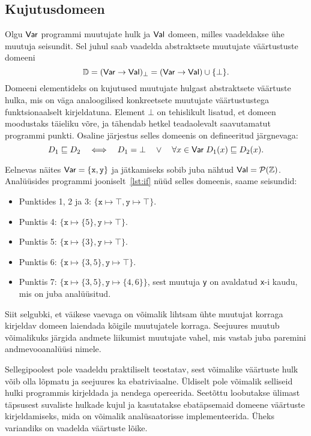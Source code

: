\documentclass[../thesis.tex]{subfiles}
\begin{document}
\subsection{Kujutusdomeen}
Olgu $\mathsf{Var}$ programmi muutujate hulk ja $\mathsf{Val}$ domeen, milles vaadeldakse ühe muutuja seisundit. Sel juhul saab vaadelda abstraktsete muutujate väärtustuste domeeni~\cite[45]{seidl_foundations}
\[
	\mathbb{D} = (\mathsf{Var} \to \mathsf{Val})_\bot = (\mathsf{Var} \to \mathsf{Val}) \cup \{\bot\}.
\]
Domeeni elementideks on kujutused muutujate hulgast abstraktsete väärtuste hulka, mis on väga analoogilised konkreetsete muutujate väärtustustega funktsionaalselt kirjeldatuna. Element $\bot$ on tehislikult lisatud, et domeen moodustaks täieliku võre, ja tähendab hetkel teadaolevalt saavutamatut programmi punkti. Osaline järjestus selles domeenis on defineeritud järgnevaga:
\[
	D_1 \sqsubseteq D_2 \quad\Longleftrightarrow\quad D_1 = \bot \quad\lor\quad \forall x \in \mathsf{Var}\; D_1(x) \sqsubseteq D_2(x).
\]

Eelnevas näites $\mathsf{Var} = \{\texttt{x}, \texttt{y}\}$ ja jätkamiseks sobib juba nähtud $\mathsf{Val} = \mathcal{P}(\mathbb{Z})$. Analüüsides programmi jooniselt~\ref{lst:if} nüüd selles domeenis, saame seisundid:
\begin{itemize}
	\item Punktides 1, 2 ja 3: $\{ \texttt{x} \mapsto \top, \texttt{y} \mapsto \top \}$.
	\item Punktis 4: $\{ \texttt{x} \mapsto \{5\}, \texttt{y} \mapsto \top \}$.
	\item Punktis 5: $\{ \texttt{x} \mapsto \{3\}, \texttt{y} \mapsto \top \}$.
	\item Punktis 6: $\{ \texttt{x} \mapsto \{3, 5\}, \texttt{y} \mapsto \top \}$.
	\item Punktis 7: $\{ \texttt{x} \mapsto \{3, 5\}, \texttt{y} \mapsto \{4, 6\} \}$, sest muutuja \texttt{y} on avaldatud \texttt{x}-i kaudu, mis on juba analüüsitud.
\end{itemize}

Siit selgubki, et väikese vaevaga on võimalik lihtsam ühte muutujat korraga kirjeldav domeen laiendada kõigile muutujatele korraga. Seejuures muutub võimalikuks järgida andmete liikumist muutujate vahel, mis vastab juba paremini andmevooanalüüsi nimele.

Sellegipoolest pole vaadeldu praktiliselt teostatav, sest võimalike väärtuste hulk võib olla lõpmatu ja seejuures ka ebatriviaalne. Üldiselt pole võimalik selliseid hulki programmis kirjeldada ja nendega opereerida. Seetõttu loobutakse ülimast täpsusest suvaliste hulkade kujul ja kasutatakse ebatäpsemaid domeene väärtuste kirjeldamiseks, mida on võimalik analüsaatorisse implementeerida. Üheks variandiks on vaadelda väärtuste lõike.
\end{document}
